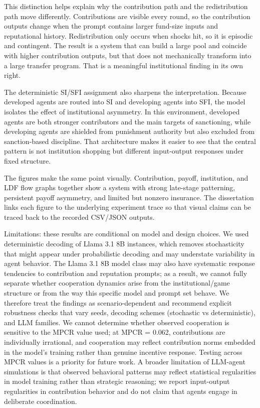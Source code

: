 \documentclass[12pt,letterpaper]{report}
\begin{document}
This distinction helps explain why the contribution path and the redistribution path move differently. Contributions are visible every round, so the contribution outputs change when the prompt contains larger fund-size inputs and reputational history. Redistribution only occurs when shocks hit, so it is episodic and contingent. The result is a system that can build a large pool and coincide with higher contribution outputs, but that does not mechanically transform into a large transfer program. That is a meaningful institutional finding in its own right.

The deterministic SI/SFI assignment also sharpens the interpretation. Because developed agents are routed into SI and developing agents into SFI, the model isolates the effect of institutional asymmetry. In this environment, developed agents are both stronger contributors and the main targets of sanctioning, while developing agents are shielded from punishment authority but also excluded from sanction-based discipline. That architecture makes it easier to see that the central pattern is not institution shopping but different input-output responses under fixed structure.

The figures make the same point visually. Contribution, payoff, institution, and LDF flow graphs together show a system with strong late-stage patterning, persistent payoff asymmetry, and limited but nonzero insurance. The dissertation links each figure to the underlying experiment trace so that visual claims can be traced back to the recorded CSV/JSON outputs.

Limitations: these results are conditional on model and design choices. We used deterministic decoding of Llama 3.1 8B instances, which removes stochasticity that might appear under probabilistic decoding and may understate variability in agent behavior. The Llama 3.1 8B model class may also have systematic response tendencies to contribution and reputation prompts; as a result, we cannot fully separate whether cooperation dynamics arise from the institutional/game structure or from the way this specific model and prompt set behave. We therefore treat the findings as scenario-dependent and recommend explicit robustness checks that vary seeds, decoding schemes (stochastic vs deterministic), and LLM families. We cannot determine whether observed cooperation is sensitive to the MPCR value used; at MPCR = 0.062, contributions are individually irrational, and cooperation may reflect contribution norms embedded in the model's training rather than genuine incentive response. Testing across MPCR values is a priority for future work. A broader limitation of LLM-agent simulations is that observed behavioral patterns may reflect statistical regularities in model training rather than strategic reasoning; we report input-output regularities in contribution behavior and do not claim that agents engage in deliberate coordination.
\end{document}
